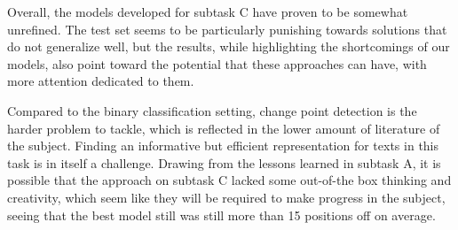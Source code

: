 Overall, the models developed for subtask C have proven to be somewhat unrefined.
The test set seems to be particularly punishing towards solutions that do not generalize well, but the results, while highlighting the shortcomings of our models, also point toward the potential that these approaches can have, with more attention dedicated to them.

Compared to the binary classification setting, change point detection is the harder problem to tackle, which is reflected in the lower amount of literature of the subject.
Finding an informative but efficient representation for texts in this task is in itself a challenge.
Drawing from the lessons learned in subtask A, it is possible that the approach on subtask C lacked some out-of-the box thinking and creativity, which seem like they will be required to make progress in the subject, seeing that the best model still was still more than 15 positions off on average.
